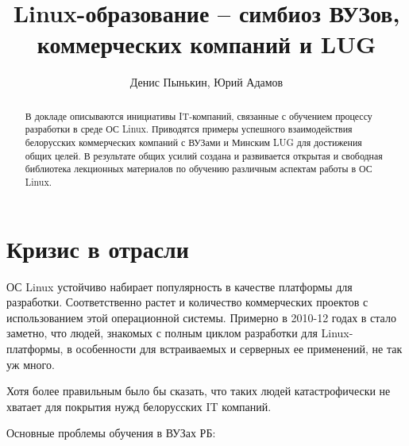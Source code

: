 \author{Денис Пынькин, Юрий Адамов}




\title{Linux-образование -- симбиоз ВУЗов, коммерческих компаний и LUG}

\maketitle

\begin{abstract}
	В докладе описываются инициативы IT-компаний,  связанные с обучением процессу  
	разработки в среде ОС Linux. Приводятся примеры успешного взаимодействия белорусских коммерческих
	компаний с ВУЗами и Минским LUG для достижения общих целей.
	В результате общих усилий создана и развивается открытая и свободная библиотека лекционных материалов по
	обучению различным аспектам работы в ОС Linux.
\end{abstract}



\section{Кризис в отрасли}

ОС Linux устойчиво набирает популярность в качестве платформы для разработки. Соответственно растет и количество 
коммерческих проектов с использованием этой операционной системы. Примерно в 2010-12 годах в стало заметно, что людей,
знакомых с полным циклом разработки для Linux-платформы, в особенности для встраиваемых и серверных ее применений,
не так уж много.

Хотя более правильным было бы сказать, что таких людей катастрофически не хватает для покрытия нужд белорусских IT компаний.

Основные проблемы обучения в ВУЗах РБ:

